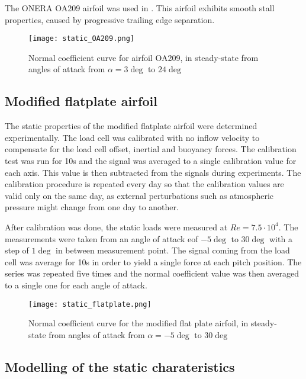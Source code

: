 The ONERA OA209 airfoil was used in \cite{mulleners_onset_2010}. This airfoil exhibits smooth stall properties, caused by progressive trailing edge separation.

\begin{wrapfigure}{r}{10cm}
\centering
\texttt{[image: static\_OA209.png]}
\caption{Normal coefficient curve for airfoil OA209, in steady-state from angles of attack from $\alpha=3 \deg$ to $24 \deg$}
\label{fig:static_flatplate}
\end{wrapfigure}

\subsection{Modified flatplate airfoil}

The static properties of the modified flatplate airfoil were determined experimentally. The load cell was calibrated with no inflow velocity to compensate for the load cell offset, inertial and  buoyancy forces. The calibration test was run for 10s and the signal was averaged to a single calibration value for each axis. This value is then subtracted from the signals during experiments. The calibration procedure is repeated every day so that the calibration values are valid only on the same day, as external perturbations such as atmospheric pressure might change from one day to another. 

After calibration was done, the static loads were measured at $Re=7.5\cdot10^4$. The measurements were taken from an angle of attack eof $-5 \deg$ to $30 \deg$ with a step of $1 \deg$ in between measurement point. The signal coming from the load cell was average for 10s in order to yield a single force at each pitch position. The series was repeated five times and the normal coefficient value was then averaged to a single one for each angle of attack. 

\begin{wrapfigure}{r}{10cm}
\centering
\texttt{[image: static\_flatplate.png]}
\caption{Normal coefficient curve for the modified flat plate airfoil, in steady-state from angles of attack from $\alpha=-5 \deg$ to $30 \deg$}
\label{fig:static_flatplate}
\end{wrapfigure}

\subsection{Modelling of the static charateristics}
\label{section:kirchhoff}

